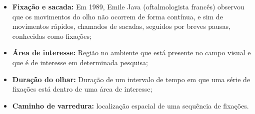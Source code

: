 \begin{itemize}
\item {\bf Fixação e sacada:} Em 1989, Emile Java (oftalmologista francês) observou que os movimentos do olho não ocorrem de forma contínua, e sim de movimentos rápidos, chamados de sacadas, seguidos por breves pausas, conhecidas como fixações;

\item {\bf Área de interesse:} Região no ambiente que está presente no campo visual e que é de interesse em determinada pesquisa;

\item {\bf Duração do olhar:} Duração de um intervalo de tempo em que uma série de fixações está dentro de uma área de interesse;

\item {\bf Caminho de varredura:} localização espacial de uma sequência de fixações.
\end{itemize}